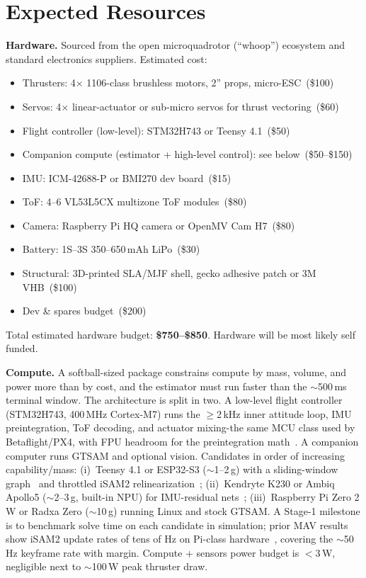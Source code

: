 \documentclass[11pt]{article}
\begin{document}
\section{Expected Resources}

\textbf{Hardware.} Sourced from the open microquadrotor (``whoop'') ecosystem
and standard electronics suppliers. Estimated cost:
\begin{itemize}[leftmargin=*]
\item Thrusters: 4$\times$ 1106-class brushless motors, 2'' props,
  micro-ESC~(\$100)
\item Servos: 4$\times$ linear-actuator or sub-micro servos for thrust
  vectoring~(\$60)
\item Flight controller (low-level): STM32H743 or Teensy 4.1~(\$50)
\item Companion compute (estimator + high-level control): see below~(\$50--\$150)
\item IMU: ICM-42688-P or BMI270 dev board~(\$15)
\item ToF: 4--6 VL53L5CX multizone ToF modules~(\$80)
\item Camera: Raspberry Pi HQ camera or OpenMV Cam H7~(\$80)
\item Battery: 1S--3S 350--650\,mAh LiPo~(\$30)
\item Structural: 3D-printed SLA/MJF shell, gecko
  adhesive patch or 3M VHB~(\$100)
\item Dev \& spares budget~(\$200)
\end{itemize}
Total estimated hardware budget: \textbf{\$750--\$850}. Hardware will be most likely self funded.

\textbf{Compute.} A softball-sized package constrains compute by mass,
volume, and power more than by cost, and the estimator must run faster
than the $\sim$500\,ms terminal window. The architecture is split in two.
A low-level flight controller (STM32H743, 400\,MHz Cortex-M7) runs the
$\geq$2\,kHz inner attitude loop, IMU preintegration, ToF decoding, and
actuator mixing-the same MCU class used by Betaflight/PX4, with FPU
headroom for the preintegration math~\cite{forster2017imu}. A companion
computer runs GTSAM and optional vision. Candidates in order of
increasing capability/mass: (i)~Teensy 4.1 or ESP32-S3 ($\sim$1--2\,g)
with a sliding-window graph~\cite{indelman2012} and throttled iSAM2
relinearization~\cite{kaess2012isam2}; (ii)~Kendryte K230 or Ambiq
Apollo5 ($\sim$2--3\,g, built-in NPU) for IMU-residual
nets~\cite{brossard2019ai}; (iii)~Raspberry Pi Zero 2\,W or Radxa Zero
($\sim$10\,g) running Linux and stock GTSAM. A Stage-1 milestone is to
benchmark solve time on each candidate in simulation; prior MAV results
show iSAM2 update rates of tens of Hz on Pi-class
hardware~\cite{indelman2012}, covering the $\sim$50\,Hz keyframe rate
with margin. Compute + sensors power budget is $<$3\,W, negligible next
to $\sim$100\,W peak thruster draw.
\end{document}
